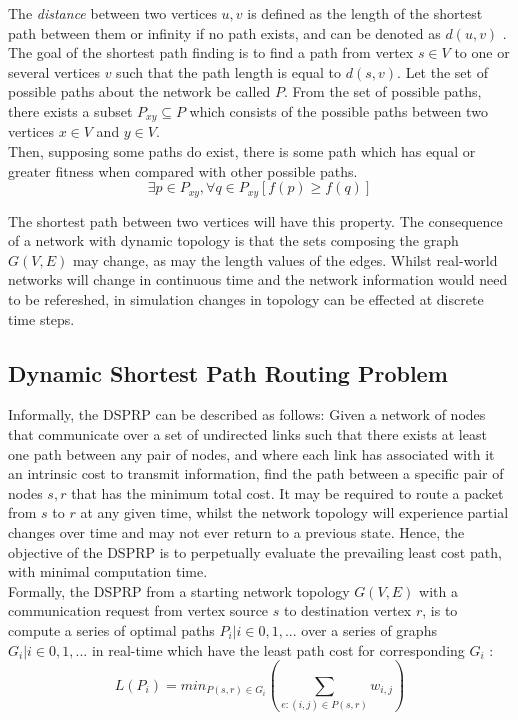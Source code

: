 \documentclass[
	a4paper, %
	10pt, %
	unnumberedsections, %
	twoside, %
]{LTJournalArticle}
\begin{document}
The \emph{distance} between two vertices \(u, v\) is defined as the length of the shortest path between them or infinity if no path exists, and can be denoted as \( d(u, v) \)  \cite{even:12}. 
The goal of the shortest path finding is to find a path from vertex \( s \in V \) to one or several vertices \( v \) such that the path length is equal to \( d(s, v) \). Let the set of possible paths about the network be called \( P \). From the set of possible paths, there exists a subset \( P_{xy} \subseteq P \) which consists of the possible paths between two vertices \(x \in V\) and \(y \in V \). \\

Then, supposing some paths do exist, there is some path which has equal or greater fitness when compared with other possible paths. 
\begin{equation}
	\exists{p} \in P_{xy}, \forall{q} \in P_{xy} [f(p) \geq f(q)]
	\label{eq:exists_sp}
\end{equation}

The shortest path between two vertices will have this property. The consequence of a network with dynamic topology is that the sets composing the graph \(G(V, E)\) may change, as may the length values of the edges. Whilst real-world networks will change in continuous time and the network information would need to be refereshed, in simulation changes in topology can be effected at discrete time steps. 

\subsection{Dynamic Shortest Path Routing Problem}

Informally, the DSPRP can be described as follows: Given a network of nodes that communicate over a set of undirected links such that there exists at least one path between any pair of nodes, and where each link has associated with it an intrinsic cost to transmit information, find the path between a specific pair of nodes \(s, r\) that has the minimum total cost. It may be required to route a packet from \(s\) to \(r\) at any given time, whilst the network topology will experience partial changes over time and may not ever return to a previous state. Hence, the objective of the DSPRP is to perpetually evaluate the prevailing least cost path, with minimal computation time. \\

Formally, the DSPRP from a starting network topology \(G(V, E)\) with a communication request from vertex source \(s\) to destination vertex \(r\), is to compute a series of optimal paths \({P_{i} | i \in {0, 1, ...}}\) over a series of graphs \({G_{i} | i \in {0, 1, ...}}\) in real-time which have the least path cost for corresponding \(G_{i}\) \cite{yang:10}: 
\begin{equation}
	 L(P_{i}) = min_{P(s,r) \in G_{i}}(\sum\limits_{e: (i, j) \in P(s, r)} w_{i,j}) 
	\label{eq:sp}
\end{equation}
\end{document}
